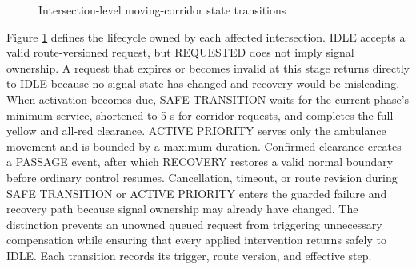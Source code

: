 \begin{figure}[htbp]
\centering
{}
\caption{Intersection-level moving-corridor state transitions}
\label{fig:corridor-state}
\end{figure}

Figure \ref{fig:corridor-state} defines the lifecycle owned by each affected intersection. IDLE accepts a valid route-versioned request, but REQUESTED does not imply signal ownership. A request that expires or becomes invalid at this stage returns directly to IDLE because no signal state has changed and recovery would be misleading. When activation becomes due, SAFE TRANSITION waits for the current phase's minimum service, shortened to 5 s for corridor requests, and completes the full yellow and all-red clearance. ACTIVE PRIORITY serves only the ambulance movement and is bounded by a maximum duration. Confirmed clearance creates a PASSAGE event, after which RECOVERY restores a valid normal boundary before ordinary control resumes. Cancellation, timeout, or route revision during SAFE TRANSITION or ACTIVE PRIORITY enters the guarded failure and recovery path because signal ownership may already have changed. The distinction prevents an unowned queued request from triggering unnecessary compensation while ensuring that every applied intervention returns safely to IDLE. Each transition records its trigger, route version, and effective step.

